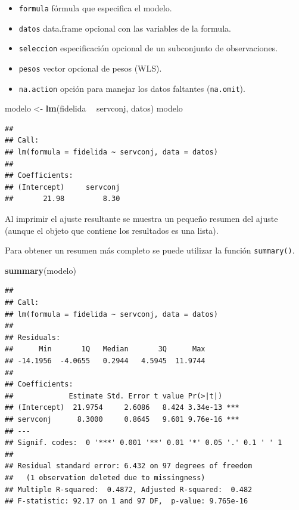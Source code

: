 \documentclass[]{book}
\newenvironment{Shaded}{\begin{snugshade}}{\end{snugshade}}
\newcommand{\KeywordTok}[1]{\textcolor[rgb]{0.13,0.29,0.53}{\textbf{#1}}}
\newcommand{\StringTok}[1]{\textcolor[rgb]{0.31,0.60,0.02}{#1}}
\newcommand{\OperatorTok}[1]{\textcolor[rgb]{0.81,0.36,0.00}{\textbf{#1}}}
\newcommand{\NormalTok}[1]{#1}
\providecommand{\tightlist}{%
  \setlength{\itemsep}{0pt}\setlength{\parskip}{0pt}}
\begin{document}
\begin{itemize}
\tightlist
\item
  \texttt{formula} fórmula que especifica el modelo.
\item
  \texttt{datos} data.frame opcional con las variables de la formula.
\item
  \texttt{seleccion} especificación opcional de un subconjunto de
  observaciones.
\item
  \texttt{pesos} vector opcional de pesos (WLS).
\item
  \texttt{na.action} opción para manejar los datos faltantes
  (\texttt{na.omit}).
\end{itemize}

\begin{Shaded}
\begin{Highlighting}[]
\NormalTok{modelo <-}\StringTok{ }\KeywordTok{lm}\NormalTok{(fidelida }\OperatorTok{~}\StringTok{ }\NormalTok{servconj, datos)}
\NormalTok{modelo}
\end{Highlighting}
\end{Shaded}

\begin{verbatim}
## 
## Call:
## lm(formula = fidelida ~ servconj, data = datos)
## 
## Coefficients:
## (Intercept)     servconj  
##       21.98         8.30
\end{verbatim}

Al imprimir el ajuste resultante se muestra un pequeño resumen del
ajuste (aunque el objeto que contiene los resultados es una lista).

Para obtener un resumen más completo se puede utilizar la función
\texttt{summary()}.

\begin{Shaded}
\begin{Highlighting}[]
\KeywordTok{summary}\NormalTok{(modelo)}
\end{Highlighting}
\end{Shaded}

\begin{verbatim}
## 
## Call:
## lm(formula = fidelida ~ servconj, data = datos)
## 
## Residuals:
##      Min       1Q   Median       3Q      Max 
## -14.1956  -4.0655   0.2944   4.5945  11.9744 
## 
## Coefficients:
##             Estimate Std. Error t value Pr(>|t|)    
## (Intercept)  21.9754     2.6086   8.424 3.34e-13 ***
## servconj      8.3000     0.8645   9.601 9.76e-16 ***
## ---
## Signif. codes:  0 '***' 0.001 '**' 0.01 '*' 0.05 '.' 0.1 ' ' 1
## 
## Residual standard error: 6.432 on 97 degrees of freedom
##   (1 observation deleted due to missingness)
## Multiple R-squared:  0.4872, Adjusted R-squared:  0.482 
## F-statistic: 92.17 on 1 and 97 DF,  p-value: 9.765e-16
\end{verbatim}
\end{document}
